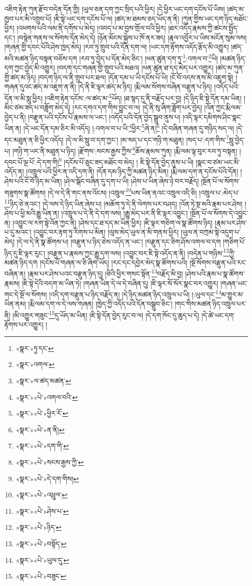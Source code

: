 འཇིག་རྟེན་ཀུན་རྫོབ་བདེན་དོན་གྱི། །ཡུལ་ཅན་དག་ཀྱང་སྲིད་པའི་ཕྱིར། །དེ་ཕྱིར་ཡང་དག་དངོས་པོ་ཡིས། །ཚད་མ་ཁྱབ་པར་མི་འགྲུབ་པོ། །ཇི་སྟེ་ཡང་དག་དངོས་པོ་ལ། །ཚད་མ་ཐམས་ཅད་ཡོད་ན་ནི། །ཀུན་གྱིས་ཡང་དག་ཉིད་མཐོང་ཕྱིར། །འཕགས་པའི་ལམ་ནི་དགོས་པ་མེད། །འབད་པ་མ་བྱས་གྲོལ་བའི་ཕྱིར། །ཐར་འདོད་རྣམས་ཀྱི་ཚངས་སྤྱོད་དང་། །བསྙེན་གནས་ལ་སོགས་དོན་མེད་དེ། །ཉོན་མོངས་སྐྱེས་པ་ཁོ་ནར་ཟད། །རྣལ་འབྱོར་པ་ཡིས་མངོན་སུམ་ལས། །གཞན་གྱི་དབང་པོའི་ཤེས་ཁྱད་མེད། །རབ་ཏུ་གྲུབ་པའི་དོན་དག་ལ། །ཡང་དག་རྟོགས་འདོད་རྩོད་མི་འགྱུར། །ཚད་མའི་མཚན་ཉིད་བསྟན་བཅོས་དག །རབ་ཏུ་བྱེད་པ་དོན་མེད་ཅིང་། །ཕན་ཚུན་དག་ཏུ་\footnote{«སྣར་»ཏུ་དང་}:འགལ་བ་\footnote{«སྣར་»འགལ་}ཡི། །མཚན་ཉིད་དག་ཀྱང་བྱེད་མི་འགྱུར། །བདག་དང་གཞན་གྱི་གྲུབ་པའི་མཐའ། །ཕན་ཚུན་ཐ་དད་མེད་པར་འགྱུར། །ཚད་མ་ཀུན་གྱི་ཚད་མ་ཉིད། །བདག་ཉིད་ལ་ནི་གྲུབ་པར་ཐལ། །དོན་དམ་པ་ཡི་དངོས་པོ་ཡི། །ངོ་བོ་འདས་ནས་མི་འཇུག་སྟེ། །གཞན་དུའང་ཚད་མ་འཇུག་ན་ནི། །དེ་ནི་ཇི་ལྟར་ཚད་མ་ཉིད། །རྨི་ལམ་སོགས་བཞིན་བརྫུན་པ་ཉིད། །འདོད་པའི་དོན་ལ་མི་སླུ་ཕྱིར། །འཇིག་རྟེན་དངོས་:ལ་ཚད་མ་\footnote{«སྣར་»ལ་ཚད་མཚན་}ཡོད། །ཐ་སྙད་དུ་ནི་བརྗོད་པར་བྱ། །དེ་ཉིད་ཇི་སྟེ་དོན་དམ་ཡིན། །མིང་ཙམ་ཟད་པ་བཟློག་མེད་དེ། །རང་དགའ་དག་གིས་བྱུང་བ་ལ། །དེ་ནི་སུ་ཞིག་ཟློག་པར་བྱེད། །འོན་ཀྱང་རྨི་ལམ་བྱེད་པ་ནི། །བརྫུན་པའི་དངོས་པོ་རྣམས་ལ་ཡང་། །འདོད་པའི་དོན་བྱེད་སྒྲུབ་ནུས་པ། །འདི་ལྟར་དམིགས་ཤིང་སྣང་ཡིན་ན། །དེ་ཡང་དོན་དམ་ཅིར་མི་འདོད། །:འགལ་བ་པ་ཡི་\footnote{«སྣར་»«པེ་»འགལ་བའི་}ཕྱིར་\footnote{«སྣར་»«པེ་»ཕྱིར་རོ་}ཞེ་ན།\footnote{«སྣར་»«པེ་»ན་ནི།} །དེ་བཞིན་གཞན་དུ་གཉིད་སད་ལ། །དེ་དང་མཐུན་ན་ཅི་ཕྱིར་འདོད། །དེ་ལ་མི་སླུ་བ་དག་ཀྱང་། །མ་སད་པ་དང་གཉི་ག་མཐུན། །སད་པ་:དག་གིས་\footnote{«སྣར་»«པེ་»དག་གི་}སླུ་བྱེད་པ། །གཉི་ག་ཡང་ནི་མཐུན་པ་ཉིད། །རྫོགས་:སངས་རྒྱས་ཀྱིས་\footnote{«སྣར་»«པེ་»སངས་རྒྱས་ཀྱི་}ཆོས་རྣམས་ཀུན། །རྨི་ལམ་ལྟ་བུར་རབ་ཏུ་བསྟན། །དབང་པོ་ལྔ་པོ་:དེ་དག་གི།\footnote{«སྣར་»«པེ་»དེ་དག་གིས།} །དངོས་པོ་ཅུང་ཟད་མཐོང་བ་མེད། །
ཇི་སྟེ་དོན་བྱེད་ནུས་པ་ཡི། །སྣང་བ་ཙམ་ཡང་མི་འདོད་ན། །འཁྲུལ་པའི་ཕྱིར་ན་འདི་དག་ནི། །དོན་དམ་ཉིད་ཀྱི་མཚན་ཉིད་མིན། །རྨི་ལམ་དག་ན་དངོས་པོའི་དོན། །ཤེས་པའི་ངོ་བོ་ཉིད་མ་ཡིན། །ཤེལ་སྒོང་བཞིན་དུ་དག་པ་ཡི། །ཤེས་པ་ཡིན་ཞེས་ཉེ་བར་བརྗོད། །སྔོན་པོ་ལ་སོགས་གཟུགས་སྣ་ཚོགས། །དེ་ལ་དེ་ནི་གང་ནས་འོངས། །འཁྲུལ་\footnote{«སྣར་»«པེ་»འཕྲུལ་}པས་ཡིན་ནའང་འཁྲུལ་འདི་ཅི། །འཁྲུལ་པ་:མེད་པ་\footnote{«སྣར་»«པེ་»ཤེས་པ་}ཉིད་ཅེ་ནའང་། །དེ་ལས་དེ་ཉིད་ཡིན་ཞེས་པ། །མཆོག་ཏུ་དེ་ནི་ལེགས་པར་བཤད། །འོན་ཏེ་སྔ་མའི་རྣམ་པར་ཤེས། །ཤེས་པ་ཕྱི་མའི་རྒྱུ་ཡིན་ན། །འཁྲུལ་པ་དེ་ནི་དེ་དག་ལས། །རྒྱུ་མེད་པར་ནི་ཇི་ལྟར་འབྱུང་། །སྔོན་པོ་ལ་སོགས་དེ་འབྱུང་ན། །འབྱུང་ལ་རག་སྟེ་འོན་ཀྱང་ནི། །ཤེས་དང་ཐ་དད་མ་ཡིན་ཕྱིར། །ཇི་ལྟར་གཅིག་ལ་སྣ་ཚོགས་ཉིད། །རྣམ་པར་ཤེས་པ་དུ་མའང་། །འབྱུང་བར་རྟག་ཏུ་རིགས་པ་མིན། །ལུས་མེད་ཡུལ་ན་མི་གནས་ཕྱིར། །ཡུལ་ན་བཀྲམ་སྟེ་འདུག་པ་མེད། །དེ་ལ་དེ་ནི་སྣ་ཚོགས་པ། །བརྫུན་པ་ཉིད་ཅེས་འདོད་ན་ཡང་། །བརྫུན་དང་ཅིག་ཤོས་འགལ་བ་དག །གཅིག་པོ་ཉིད་དུ་ཇི་ལྟར་རུང་། །བརྫུན་པ་རྣམས་ཀྱང་རྒྱུ་དག་ལས། །འབྱུང་བར་ཇི་སྟེ་འདོད་ན་ནི། །བདེན་པ་གཉིས་\footnote{«སྣར་»«པེ་»ཉིད་}ཀྱི་མཚན་ཉིད་དག །དངོས་པོ་གཞན་ལ་ཅི་ཞིག་ཡོད། །རང་དང་དབྱེར་མེད་སྣ་ཚོགས་པའི། །སྔོ་སོགས་བརྫུན་པའི་རང་བཞིན་ན། །རྣམ་པར་ཤེས་པའང་བརྫུན་ཉིད་དུ། །ཅིའི་ཕྱིར་གསང་སྟོན་\footnote{«སྣར་»«པེ་»བསྟོད་}བརྗོད་མི་བྱ། །ཤེས་པའི་རྣམ་པ་སྣ་ཚོགས་རྣམས། །ཇི་སྟེ་དེའི་བདག་མ་ཡིན་ཏེ། །གཞན་ཡིན་དེ་ལ་དེ་བཞིན་དུ། །ཇི་ལྟར་སོ་སོར་སྣང་བར་འགྱུར། །གཞན་ཡང་གང་དེ་སྔོ་ལ་སོགས། །འདི་དག་བརྫུན་པ་ཉིད་བརྗོད་ན། །དེ་ཉིད་མཚན་ཉིད་འཁྲུལ་པ་ཡི། །:ཡུལ་དང་\footnote{«སྣར་»«པེ་»ཡུལ་དུ་}མ་གྱུར་མ་ཡིན་ནམ། །རྨི་ལམ་དག་ལ་དེ་ལས་གཞན། །ཁྱེད་ཀྱི་འདོད་པའི་དོན་བསྒྲུབ་ཅིང་། །གང་གིས་མཚན་ཉིད་འཁྲུལ་པར་ནི། །མི་འགྱུར་གཟུང་\footnote{«སྣར་»«པེ་»བཟུང་}དུ་ཡོད་མ་ཡིན། །ཇི་སྟེ་དོན་བྱེད་རུང་བ་ལ། །དེ་དག་ཁོང་དུ་ཆུད་པ་དེ། །དེ་ཚེ་ཡང་དག་རྟོགས་པར་འགྱུར། །
